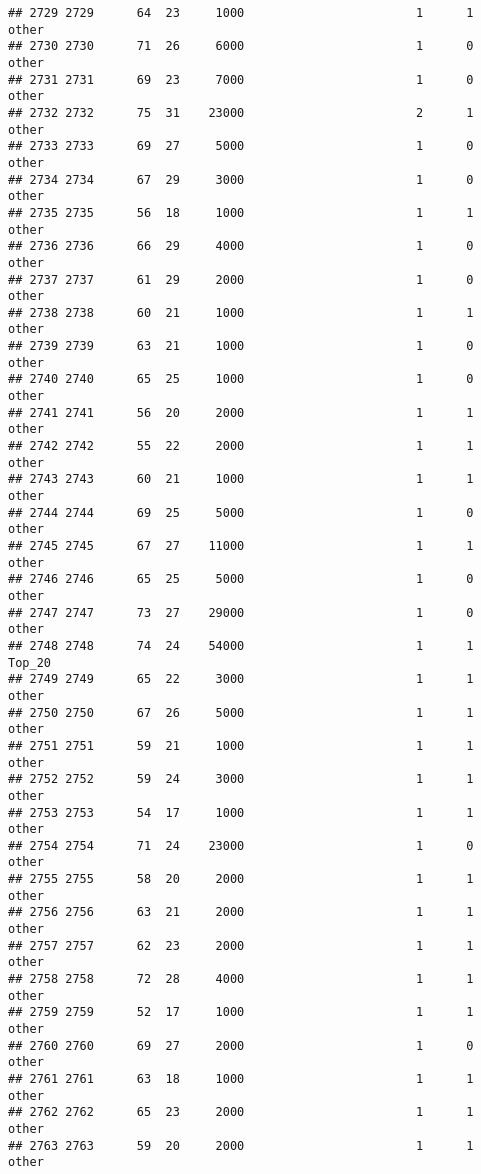 \documentclass[
]{article}
\begin{document}
\begin{verbatim}
## 2729 2729      64  23     1000                        1      1    other
## 2730 2730      71  26     6000                        1      0    other
## 2731 2731      69  23     7000                        1      0    other
## 2732 2732      75  31    23000                        2      1    other
## 2733 2733      69  27     5000                        1      0    other
## 2734 2734      67  29     3000                        1      0    other
## 2735 2735      56  18     1000                        1      1    other
## 2736 2736      66  29     4000                        1      0    other
## 2737 2737      61  29     2000                        1      0    other
## 2738 2738      60  21     1000                        1      1    other
## 2739 2739      63  21     1000                        1      0    other
## 2740 2740      65  25     1000                        1      0    other
## 2741 2741      56  20     2000                        1      1    other
## 2742 2742      55  22     2000                        1      1    other
## 2743 2743      60  21     1000                        1      1    other
## 2744 2744      69  25     5000                        1      0    other
## 2745 2745      67  27    11000                        1      1    other
## 2746 2746      65  25     5000                        1      0    other
## 2747 2747      73  27    29000                        1      0    other
## 2748 2748      74  24    54000                        1      1   Top_20
## 2749 2749      65  22     3000                        1      1    other
## 2750 2750      67  26     5000                        1      1    other
## 2751 2751      59  21     1000                        1      1    other
## 2752 2752      59  24     3000                        1      1    other
## 2753 2753      54  17     1000                        1      1    other
## 2754 2754      71  24    23000                        1      0    other
## 2755 2755      58  20     2000                        1      1    other
## 2756 2756      63  21     2000                        1      1    other
## 2757 2757      62  23     2000                        1      1    other
## 2758 2758      72  28     4000                        1      1    other
## 2759 2759      52  17     1000                        1      1    other
## 2760 2760      69  27     2000                        1      0    other
## 2761 2761      63  18     1000                        1      1    other
## 2762 2762      65  23     2000                        1      1    other
## 2763 2763      59  20     2000                        1      1    other

\end{verbatim}
\end{document}
